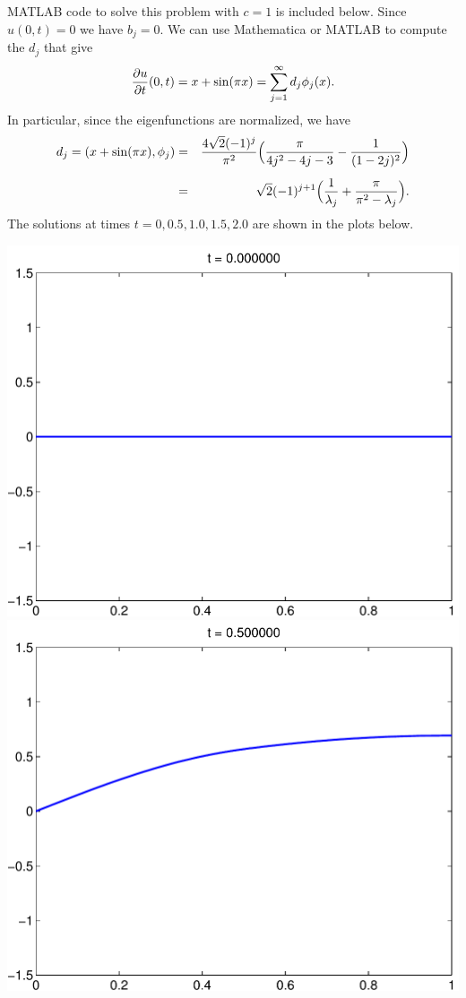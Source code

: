 {\begin{solution}
\begin{enumerate}
 MATLAB code to solve this problem with $c=1$ is included below.  
      Since $u(0,t) = 0$ we have  $b_j = 0$.  
      We can use Mathematica or MATLAB to compute the $d_j$ that give
      \[ {{\partial} u \over {\partial} t}(0,t) = x+\sin(\pi x) = \sum_{j=1}^\infty d_j \phi_j(x).\]
      In particular, since the eigenfunctions are normalized, we have
      \begin{eqnarray*}
         d_j = (x + \sin(\pi x), \phi_j) 
            &=& {4\sqrt{2} (-1)^{j}\over \pi^2}
                 \Big({\pi \over 4j^2-4j-3} - {1\over (1-2j)^2}\Big) \\[0.5em]
            &=& \sqrt{2} (-1)^{j+1}
                \Big({1\over \lambda_j} + {\pi \over \pi^2 -\lambda_j}\Big).
      \end{eqnarray*} 
      The solutions at times $t=0, 0.5, 1.0, 1.5, 2.0$ are shown in the plots below.

\begin{center}
\includegraphics[scale=0.35]{mixed_0}\quad
\includegraphics[scale=0.35]{mixed_1}


\end{center}
\end{enumerate}
\end{solution}}
